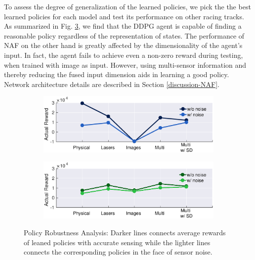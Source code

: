 \documentclass[../thesis.tex]{subfiles}
\begin{document}
To assess the degree of generalization of the learned policies, we pick the the best learned policies for each model and test its performance on other racing tracks. As summarized in Fig. \ref{fig:actual_robust}, we find that the DDPG agent is capable of finding a reasonable policy regardless of the representation of states. The performance of NAF on the other hand is greatly affected by the dimensionality of the agent's input. In fact, the agent fails to achieve even a non-zero reward during testing, when trained with image as input. However, using multi-sensor information and thereby reducing the fused input dimension aids in learning a good policy. Network architecture details are described in Section \ref{discussion-NAF}.

\begin{figure}[t]
	\centering
	\begin{subfigure}[b]{0.4\linewidth}
		\includegraphics[width=0.9\columnwidth]{./MultimodalDRL/fig/actual_robust_naf}
		\label{fig:actual_robust_naf}
	\end{subfigure}
	\begin{subfigure}[b]{0.4\linewidth}
		\includegraphics[width=0.9\columnwidth]{./MultimodalDRL/fig/actual_robust_ddpg}
		\label{fig:actual_robust_ddpg}
	\end{subfigure}
	\caption{Policy Robustness Analysis: Darker lines connects average rewards of leaned policies with accurate sensing while the lighter lines connects the corresponding policies in the face of sensor noise.}
    \label{fig:actual_robust}
\end{figure}
\end{document}
